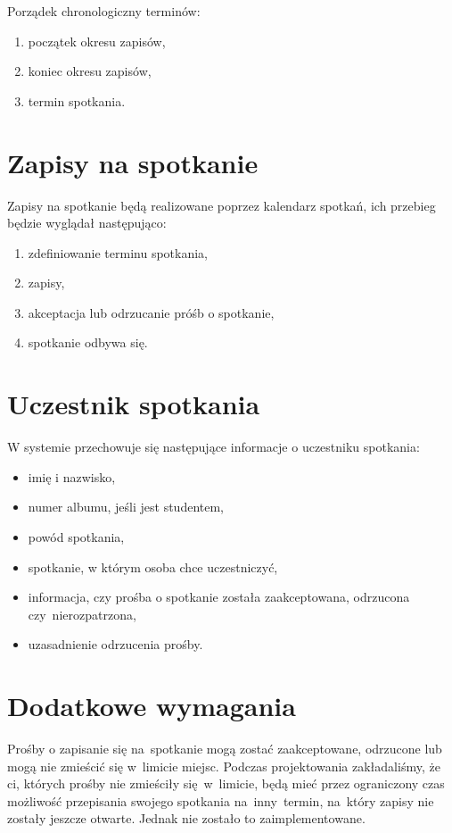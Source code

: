 \documentclass[licencjacka]{pracamgr}
\begin{document}
Porządek chronologiczny terminów:

\begin{enumerate}
\setlength\itemsep{0,05em}
    \item początek okresu zapisów,
    \item koniec okresu zapisów,
    \item termin spotkania.
\end{enumerate}

\section{Zapisy na spotkanie}
Zapisy na spotkanie będą realizowane poprzez kalendarz spotkań, ich przebieg będzie wyglądał następująco:

\begin{enumerate}
    \item zdefiniowanie terminu spotkania,
    \item zapisy,
    \item akceptacja lub odrzucanie próśb o spotkanie,
    \item spotkanie odbywa się.
\end{enumerate}

\section{Uczestnik spotkania}
W systemie przechowuje się następujące informacje o uczestniku spotkania:

\begin{itemize}
\setlength\itemsep{0,05em}
    \item imię i nazwisko,
    \item numer albumu, jeśli jest studentem,
    \item powód spotkania,
    \item spotkanie, w którym osoba chce uczestniczyć,
    \item informacja, czy prośba o spotkanie została zaakceptowana, odrzucona czy~nierozpatrzona,
    \item uzasadnienie odrzucenia prośby.
\end{itemize}

\section{Dodatkowe wymagania}
Prośby o zapisanie się na~spotkanie mogą zostać zaakceptowane, odrzucone lub mogą nie zmieścić się w~limicie miejsc. Podczas projektowania zakładaliśmy, że ci, których prośby nie zmieściły się~w~limicie, będą mieć przez ograniczony czas możliwość przepisania swojego spotkania na~inny~termin, na~który zapisy nie zostały jeszcze otwarte. Jednak nie zostało to zaimplementowane.
\end{document}

